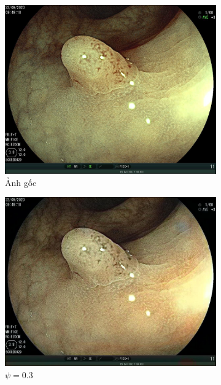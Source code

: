 \documentclass[12pt]{extreport}
\begin{document}
\begin{figure}[H]
    \centering
    \begin{subfigure}[H]{0.19\textwidth}
        \centering
        \includegraphics[width=\linewidth]{psi/0c56215fcd9b61e15625e0984adce794.jpeg}
        \caption{Ảnh gốc}
    \end{subfigure}
    \begin{subfigure}[H]{0.19\textwidth}
        \centering
        \includegraphics[width=\linewidth]{psi/03.jpeg}
        \caption{$ \psi = 0.3 $}
    \end{subfigure}
    \begin{subfigure}[H]{0.19\textwidth}

\end{subfigure}
\end{figure}
\end{document}
